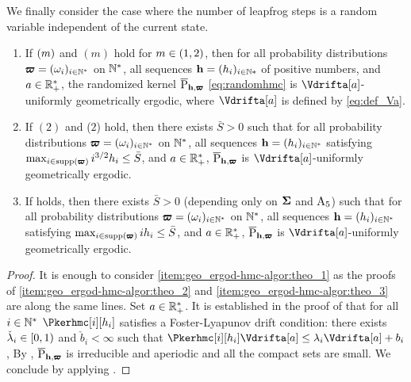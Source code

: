 We  finally consider the case where the number of leapfrog steps is a random variable
independent of the current state.
\begin{theorem}
\label{coro:geo_ergod-hmc-algor}
\begin{enumerate}[label=(\alph*)]
  \item
  \label{item:geo_ergod-hmc-algor:theo_1}
 If   $(m)$ and  $(m)$ hold for  $m\in (1,2)$,  then for all probability distributions $\pmb{\varpi}=(\omega_i)_{i \in \mathbb{N}^*}$ on $\mathbb{N}^*$, all sequences $\mathbf{h}= (h_i)_{i \in \mathbb{N}*}$ of positive numbers,  and $a \in \mathbb{R}^*_+$, the randomized kernel  $\overline{\mathrm{P}}_{\mathbf{h},\pmb{\varpi}}$ \eqref{eq:randomhmc} is $\Vdrifta[\a]$-uniformly geometrically ergodic, where $\Vdrifta[a]$ is defined by \eqref{eq:def_Va}.
\item
  \label{item:geo_ergod-hmc-algor:theo_2}
  If  $(2)$ and ($2$) hold, then there exists $\bar{S}>0$ such that for all probability distributions $\pmb{\varpi}=(\omega_i)_{i \in \mathbb{N}^*}$ on $\mathbb{N}^*$, all sequences $\mathbf{h}= (h_i)_{i \in \mathbb{N}^*}$ satisfying $\max_{i \in \operatorname{supp}(\pmb{\varpi})} i^{3/2} h_i \leq \bar{S}$,  and $a \in \mathbb{R}^*_+$, $\overline{\mathrm{P}}_{\mathbf{h},\pmb{\varpi}}$ is $\Vdrifta[\a]$-uniformly geometrically ergodic.
\item   \label{item:geo_ergod-hmc-algor:theo_3}
  If  holds, then there exists $\bar{S}>0$ (depending only on $\boldsymbol{\Sigma}$ and $\operatorname{A}_5$) such that for all  probability distributions $\pmb{\varpi}=(\omega_i)_{i \in \mathbb{N}^*}$ on $\mathbb{N}^*$, all sequences $\mathbf{h}= (h_i)_{i \in \mathbb{N}^*}$ satisfying $\max_{i\in \operatorname{supp}(\pmb{\varpi})} i h_i \leq \bar{S}$,  and $a \in \mathbb{R}^*_+$, $\overline{\mathrm{P}}_{\mathbf{h},\pmb{\varpi}}$ is $\Vdrifta[\a]$-uniformly geometrically ergodic.
\end{enumerate}
\end{theorem}
\begin{proof}
It is enough to consider \ref{item:geo_ergod-hmc-algor:theo_1} as the proofs
of \ref{item:geo_ergod-hmc-algor:theo_2} and \ref{item:geo_ergod-hmc-algor:theo_3} are along the same lines.
Set $a \in \mathbb{R}_+^*$. It is established in the proof of   that  for all $i \in \mathbb{N}^*$
$\Pkerhmc[i][h_i]$ satisfies a Foster-Lyapunov drift condition:
there exists $\check{\lambda}_i \in \left[0,1\right)$ and $\check{b}_i < \infty$ such that
$\Pkerhmc[i][h_i] \Vdrifta[a] \leq \lambda_i \Vdrifta[a] + b_i$,
By ,   $\overline{\mathrm{P}}_{\mathbf{h},\pmb{\varpi}}$ is irreducible and aperiodic and all the compact sets are small. We conclude by applying \cite[Theorem~15.2.4]{douc:moulines:priouret:2018}.
\end{proof}

